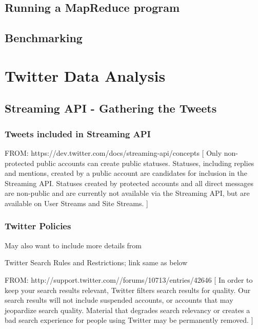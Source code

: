 \documentclass[12pt,a4paper]{report}
\begin{document}
\section{Running a MapReduce program}
\section{Benchmarking}


\chapter{Twitter Data Analysis}

\section{Streaming API - Gathering the Tweets}

\subsection{Tweets included in Streaming API}

FROM: https://dev.twitter.com/docs/streaming-api/concepts
[
Only non-protected public accounts can create public statuses. 
Statuses, including replies and mentions, created by a public 
account are candidates for inclusion in the Streaming API. Statuses 
created by protected accounts and all direct messages are non-public 
and are currently not available via the Streaming API, but are 
available on User Streams and Site Streams.
]

\subsection{Twitter Policies}

May also want to include more details from

Twitter Search Rules and Restrictions; link same as below

FROM: http://support.twitter.com//forums/10713/entries/42646
[
In order to keep your search results relevant, Twitter filters search 
results for quality. Our search results will not include suspended accounts, 
or accounts that may jeopardize search quality. Material that degrades 
search relevancy or creates a bad search experience for 
people using Twitter may be permanently removed.
]
\end{document}
